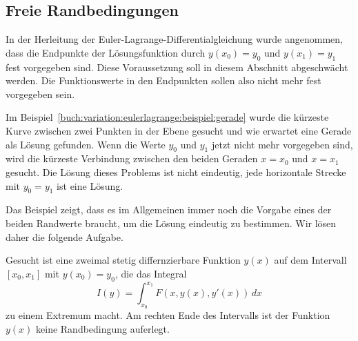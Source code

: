 %
%
%

%
%
\subsection{Freie Randbedingungen
\label{buch:variation:eulerlagrange:subsection:freierb}}
In der Herleitung der Euler-Lagrange-Differentialgleichung wurde angenommen,
dass die Endpunkte der Lösungsfunktion durch $y(x_0)=y_0$ und $y(x_1)=y_1$
fest vorgegeben sind.
Diese Voraussetzung soll in diesem Abschnitt abgeschwächt werden.
Die Funktionswerte in den Endpunkten sollen also nicht mehr fest
vorgegeben sein.

\begin{beispiel}
\label{buch:variation:eulerlagrange:beispiel:freiegerade}
Im Beispiel~\ref{buch:variation:eulerlagrange:beispiel:gerade}
wurde die kürzeste Kurve zwischen zwei Punkten in der Ebene
gesucht und wie erwartet eine Gerade als Lösung gefunden.
Wenn die Werte $y_0$ und $y_1$ jetzt nicht mehr vorgegeben sind,
wird die kürzeste Verbindung zwischen den beiden Geraden
$x=x_0$ und $x=x_1$ gesucht.
Die Lösung dieses Problems ist nicht eindeutig, jede horizontale
Strecke mit $y_0=y_1$ ist eine Lösung.
\end{beispiel}

Das Beispiel zeigt, dass es im Allgemeinen immer noch die Vorgabe
eines der beiden Randwerte braucht, um die Lösung eindeutig zu
bestimmen.
Wir lösen daher die folgende Aufgabe.

\begin{aufgabe}
Gesucht ist eine zweimal stetig differnzierbare Funktion $y(x)$ auf
dem Intervall $[x_0,x_1]$ mit $y(x_0)=y_0$, die das Integral
\[
I(y)
=
\int_{x_0}^{x_1} F(x,y(x),y'(x))\,dx
\]
zu einem Extremum macht.
Am rechten Ende des Intervalls ist der Funktion $y(x)$ keine
Randbedingung auferlegt.
\end{aufgabe}

